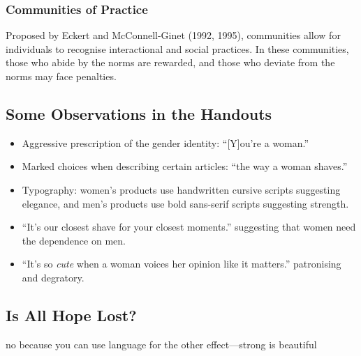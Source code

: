 \documentclass[../main.tex]{subfiles}
\begin{document}
            \subsubsection{Communities of Practice}
            Proposed by Eckert and McConnell-Ginet (1992, 1995), communities allow for individuals to recognise interactional and social practices. In these communities, those who abide by the norms are rewarded, and those who deviate from the norms may face penalties. 

        \subsection{Some Observations in the Handouts}
        \begin{itemize}
            \item Aggressive prescription of the gender identity: ``[Y]ou're a woman.''
            \item Marked choices when describing certain articles: ``the way a woman shaves.''
            \item Typography: women's products use handwritten cursive scripts suggesting elegance, and men's products use bold sans-serif scripts suggesting strength.
            \item ``It's our closest shave for your closest moments.'' suggesting that women need the dependence on men.
            \item ``It's so \textit{cute} when a woman voices her opinion like it matters.'' patronising and degratory.
        \end{itemize}

        \subsection{Is All Hope Lost?}
        no because you can use language for the other effect---strong is beautiful
\end{document}
